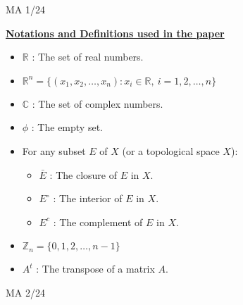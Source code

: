 \documentclass{article}
\begin{document}
							\vspace{25em}
							\begin{center}
							    {MA 1/24}
							    \end{center}
							    \vspace{1em}

							    \newpage

							    \begin{center}
							        \uline {\textbf{Notations and Definitions used in the paper}}
								\end{center}

								\vspace{1em}
								\begin{itemize}
								    \item $\mathbb{R}$ : The set of real numbers.

								        \item $\mathbb{R}^n = \{(x_1, x_2, \ldots, x_n): x_i \in \mathbb{R},\ i = 1,2,\ldots,n\}$

									    \item $\mathbb{C}$ : The set of complex numbers.

									        \item $\phi$ : The empty set.

										    \item For any subset $E$ of $X$ (or a topological space $X$):
										        \begin{itemize}
											        \item $\bar{E}$ : The closure of $E$ in $X$.
												        \item $E^\circ$ : The interior of $E$ in $X$.
													        \item $E^c$ : The complement of $E$ in $X$.
														    \end{itemize}

														        \item $\mathbb{Z}_n = \{0, 1, 2, \ldots, n-1\}$

															    \item $A^t$ : The transpose of a matrix $A$.
															    \end{itemize}
															    \vspace{45em}
															    \begin{center}
															        {MA 2/24}
																\end{center}
																\newpage
\end{document}
